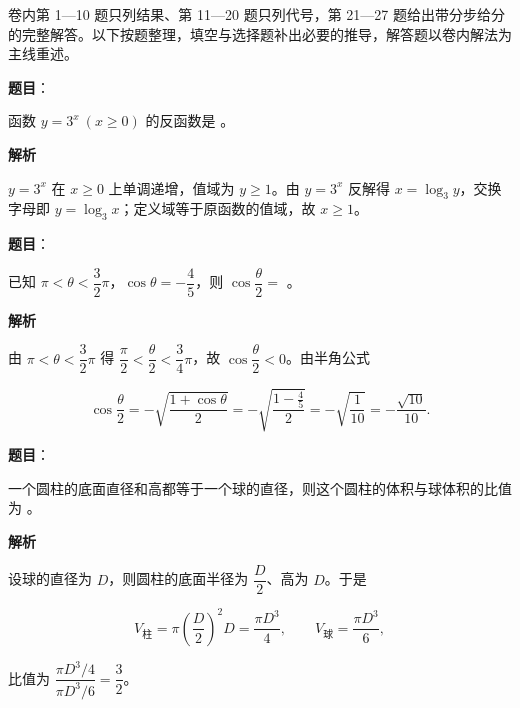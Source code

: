 

卷内第 1—10 题只列结果、第 11—20 题只列代号，第 21—27 题给出带分步给分的完整解答。以下按题整理，填空与选择题补出必要的推导，解答题以卷内解法为主线重述。


\begin{answer}

\textbf{题目}：

函数 $y=3^{x}\ (x\ge 0)$ 的反函数是 \gkblank{}。

\textbf{解析}

$y=3^{x}$ 在 $x\ge 0$ 上单调递增，值域为 $y\ge 1$。由 $y=3^{x}$ 反解得 $x=\log_{3}y$，交换字母即 $y=\log_{3}x$；定义域等于原函数的值域，故 $x\ge 1$。


\end{answer}
\begin{answer}

\textbf{题目}：

已知 $\pi<\theta<\dfrac{3}{2}\pi$，$\cos\theta=-\dfrac{4}{5}$，则 $\cos\dfrac{\theta}{2}=$ \gkblank{}。

\textbf{解析}

由 $\pi<\theta<\dfrac{3}{2}\pi$ 得 $\dfrac{\pi}{2}<\dfrac{\theta}{2}<\dfrac{3}{4}\pi$，故 $\cos\dfrac{\theta}{2}<0$。由半角公式

\nopagebreak[4]
\[
\cos\frac{\theta}{2}=-\sqrt{\frac{1+\cos\theta}{2}}=-\sqrt{\frac{1-\frac{4}{5}}{2}}=-\sqrt{\frac{1}{10}}=-\frac{\sqrt{10}}{10}.
\]


\end{answer}
\begin{answer}

\textbf{题目}：

一个圆柱的底面直径和高都等于一个球的直径，则这个圆柱的体积与球体积的比值为 \gkblank{}。

\textbf{解析}

设球的直径为 $D$，则圆柱的底面半径为 $\dfrac{D}{2}$、高为 $D$。于是

\nopagebreak[4]
\[
V_{\text{柱}}=\pi\left(\frac{D}{2}\right)^{2}D=\frac{\pi D^{3}}{4},\qquad
V_{\text{球}}=\frac{\pi D^{3}}{6},
\]

比值为 $\dfrac{\pi D^{3}/4}{\pi D^{3}/6}=\dfrac{3}{2}$。


\end{answer}
